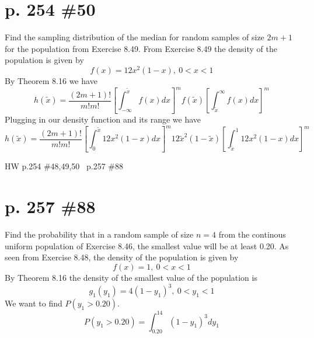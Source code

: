 \documentclass[12pt]{article}
\begin{document}
	\section[20pt]{p. 254 \#50}
	Find the sampling distribution of the median for random samples of size \(2m+1\) for the population from Exercise 8.49.
	\newline
	\newline
	From Exercise 8.49 the density of the population is given by
	\[f(x)=12x^2(1-x),\ 0<x<1\]
	By Theorem 8.16 we have
	\[h(\tilde{x})=\frac{(2m+1)!}{m!m!}\left[\int_{-\infty}^{\tilde{x}}f(x)dx\right]^mf(\tilde{x})\left[\int_{\tilde{x}}^{\infty}f(x)dx\right]^m\]
	Plugging in our density function and its range we have
	\[h(\tilde{x})=\frac{(2m+1)!}{m!m!}\left[\int_{0}^{\tilde{x}}12x^2(1-x)dx\right]^m12\tilde{x}^2(1-\tilde{x})\left[\int_{\tilde{x}}^{1}12x^2(1-x)dx\right]^m\]
	\newpage
		\maketitle HW p.254 \#48,49,50 \ p.257 \#88
		\section[20pt]{p. 257 \#88}
		Find the probability that in a random sample of size \(n=4\) from the continous uniform population of Exercise 8.46, the smallest value will be at least 0.20. \newline \newline
		As seen from Exercise 8.48, the density of the population is given by
		\[f(x)=1,\ 0 < x <1\]
		By Theorem 8.16 the density of the smallest value of the population is
		\[g_1(y_1)=4(1-y_1)^3,\ 0 < y_1 < 1\]
		We want to find \(P(y_1 > 0.20)\).
		\[P(y_1 > 0.20) = \int_{0.20}^14(1-y_1)^3dy_1\]
\end{document}
